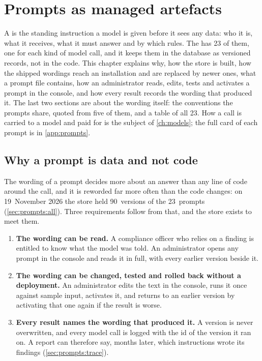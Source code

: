 \chapter{Prompts as managed artefacts}\label{ch:prompts}

A  is the standing instruction a model is given before it sees any data: who it
is, what it receives, what it must answer and by which rules. The \product{} has 23 of them, one
for each kind of model call, and it keeps them in the database as versioned records, not in
the code. This chapter explains why, how the store is built, how the shipped wordings reach an
installation and are replaced by newer ones, what a prompt file contains, how an administrator
reads, edits, tests and activates a prompt in the console, and how every result records the
wording that produced it. The last two sections are about the wording itself: the conventions
the prompts share, quoted from five of them, and a table of all 23. How a call is carried to a
model and paid for is the subject of \cref{ch:models}; the full card of each prompt is in
\cref{app:prompts}.


\section{Why a prompt is data and not code}\label{sec:prompts:why}

The wording of a prompt decides more about an answer than any line of code around the call,
and it is reworded far more often than the code changes: on 19~November 2026 the store
held 90~versions of the 23~prompts (\cref{sec:prompts:all}). Three requirements follow from
that, and the store exists to meet them.

\begin{enumerate}
  \item \textbf{The wording can be read.} A compliance officer who relies on a finding is
    entitled to know what the model was told. An administrator opens any prompt in the console
    and reads it in full, with every earlier version beside it.
  \item \textbf{The wording can be changed, tested and rolled back without a deployment.} An
    administrator edits the text in the console, runs it once against sample input, activates
    it, and returns to an earlier version by activating that one again if the result is worse.
  \item \textbf{Every result names the wording that produced it.} A version is never
    overwritten, and every model call is logged with the id of the version it ran on. A report
    can therefore say, months later, which instructions wrote its findings
    (\cref{sec:prompts:trace}).
\end{enumerate}

